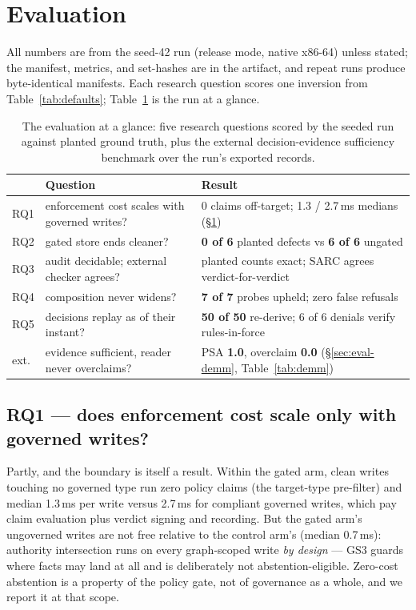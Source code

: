 \section{Evaluation}
\label{sec:eval}

All numbers are from the seed-42 \census run (release mode, native
x86-64) unless stated; the manifest, metrics, and set-hashes are in the
artifact, and repeat runs produce byte-identical manifests. Each
research question scores one inversion from Table~\ref{tab:defaults};
Table~\ref{tab:scorecard} is the run at a glance.

\begin{table}[t]
\centering
\footnotesize
\begin{tabular}{@{}lll@{}}
\toprule
 & Question & Result \\
\midrule
RQ1 & enforcement cost scales with governed writes?
    & 0 claims off-target; 1.3 / 2.7\,ms medians (\S\ref{sec:eval}) \\
RQ2 & gated store ends cleaner?
    & \textbf{0 of 6} planted defects vs \textbf{6 of 6} ungated \\
RQ3 & audit decidable; external checker agrees?
    & planted counts exact; SARC agrees verdict-for-verdict \\
RQ4 & composition never widens?
    & \textbf{7 of 7} probes upheld; zero false refusals \\
RQ5 & decisions replay as of their instant?
    & \textbf{50 of 50} re-derive; 6 of 6 denials verify rules-in-force \\
\midrule
ext. & evidence sufficient, reader never overclaims?
    & PSA \textbf{1.0}, overclaim \textbf{0.0} (\S\ref{sec:eval-demm},
      Table~\ref{tab:demm}) \\
\bottomrule
\end{tabular}
\caption{The evaluation at a glance: five research questions scored by
the seeded \census run against planted ground truth, plus the external
decision-evidence sufficiency benchmark over the run's exported
records.}
\label{tab:scorecard}
\end{table}

\subsection{RQ1 --- does enforcement cost scale only with governed writes?}
Partly, and the boundary is itself a result. Within the gated arm,
clean writes touching no governed type run zero policy claims (the
target-type pre-filter) and median 1.3\,ms per write versus 2.7\,ms
for compliant governed writes, which pay claim evaluation plus verdict
signing and recording. But the gated arm's ungoverned writes are not
free relative to the control arm's (median 0.7\,ms): authority
intersection runs on every graph-scoped write \emph{by design} --- GS3
guards where facts may land at all and is deliberately not
abstention-eligible. Zero-cost abstention is a property of the policy
gate, not of governance as a whole, and we report it at that scope.

